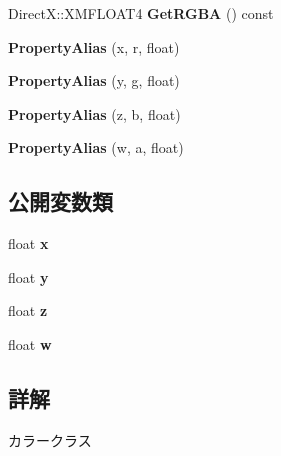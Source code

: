 \begin{DoxyCompactItemize}
\item 
Direct\+X\+::\+X\+M\+F\+L\+O\+A\+T4 {\bfseries Get\+R\+G\+BA} () const \hypertarget{class_color_a337d782eb5ae4dcd7b2946ce11b3e9c5}{}\label{class_color_a337d782eb5ae4dcd7b2946ce11b3e9c5}

\item 
{\bfseries Property\+Alias} (x, r, float)\hypertarget{class_color_a7aae39e182538b2d949d46e458271aeb}{}\label{class_color_a7aae39e182538b2d949d46e458271aeb}

\item 
{\bfseries Property\+Alias} (y, g, float)\hypertarget{class_color_ad99cd8a5492be2728592b0498994f4a3}{}\label{class_color_ad99cd8a5492be2728592b0498994f4a3}

\item 
{\bfseries Property\+Alias} (z, b, float)\hypertarget{class_color_ae61953d5aa2aaaa33d08f2704cef2fe1}{}\label{class_color_ae61953d5aa2aaaa33d08f2704cef2fe1}

\item 
{\bfseries Property\+Alias} (w, a, float)\hypertarget{class_color_a78543103c106d8c228ec967ce97f3b95}{}\label{class_color_a78543103c106d8c228ec967ce97f3b95}

\end{DoxyCompactItemize}
\subsection*{公開変数類}
\begin{DoxyCompactItemize}
\item 
float {\bfseries x}\hypertarget{class_color_ad0da36b2558901e21e7a30f6c227a45e}{}\label{class_color_ad0da36b2558901e21e7a30f6c227a45e}

\item 
float {\bfseries y}\hypertarget{class_color_aa4f0d3eebc3c443f9be81bf48561a217}{}\label{class_color_aa4f0d3eebc3c443f9be81bf48561a217}

\item 
float {\bfseries z}\hypertarget{class_color_af73583b1e980b0aa03f9884812e9fd4d}{}\label{class_color_af73583b1e980b0aa03f9884812e9fd4d}

\item 
float {\bfseries w}\hypertarget{class_color_a56eca241e2896b9f57a79589e76fd24b}{}\label{class_color_a56eca241e2896b9f57a79589e76fd24b}

\end{DoxyCompactItemize}


\subsection{詳解}
カラークラス 

